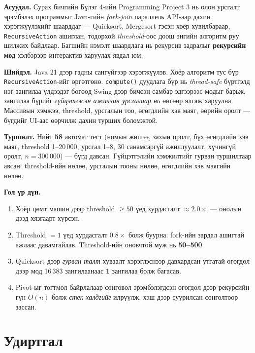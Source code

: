 \documentclass[11pt,a4paper]{article}
\begin{document}
\textbf{Асуудал.} Сурах бичгийн Бүлэг 4-ийн Programming Project 3 нь олон
урсгалт эрэмбэлэх программыг Java-гийн \emph{fork-join} параллель API-аар
дахин хэрэгжүүлэхийг шаарддаг --- Quicksort, Mergesort гэсэн хоёр хувилбараар,
\texttt{RecursiveAction} ашиглан, тодорхой \emph{threshold}-оос доош энгийн
алгоритм руу шилжих байдлаар. Багшийн нэмэлт шаардлага нь рекурсив задралыг
\textbf{рекурсийн мод} хэлбэрээр интерактив харуулах явдал юм.

\textbf{Шийдэл.} Java 21 дээр гадны сангүйгээр хэрэгжүүлэв. Хоёр алгоритм
тус бүр \texttt{RecursiveAction}-ийг өргөтгөнө. \texttt{compute()} дуудлага бүр
нь \emph{thread-safe} бүртгэлд нэг зангилаа үлдээдэг бөгөөд Swing дээр бичсэн
самбар эдгээрээс модыг барьж, зангилаа бүрийг \emph{гүйцэтгэсэн ажилчин
урсгалаар нь} өнгөөр ялгаж харуулна. Массивын хэмжээ, threshold, урсгалын тоо,
өгөгдлийн хэв маяг, өөрийн оролт --- бүгдийг UI-аас өөрчилж дахин турших
боломжтой.

\textbf{Туршилт.} Нийт \textbf{58} автомат тест (номын жишээ, захын оролт,
бүх өгөгдлийн хэв маяг, threshold 1--20\,000, урсгал 1--8, 30 санамсаргүй
ажиллуулалт, хүчингүй оролт, $n = 300\,000$) --- бүгд давсан. Гүйцэтгэлийн
хэмжилтийг гурван туршилтаар авсан: threshold-ийн нөлөө, урсгалын тооны нөлөө,
өгөгдлийн хэв маягийн нөлөө.

\textbf{Гол үр дүн.}
\begin{enumerate}[nosep,leftmargin=*]
  \item Хоёр цөмт машин дээр threshold $\ge 50$ үед хурдасгалт $\approx
        \mathbf{2.0\times}$ --- онолын дээд хязгаарт хүрсэн.
  \item Threshold $= 1$ үед хурдасгалт $\mathbf{0.8\times}$ болж буурна:
        fork-ийн зардал ашигтай ажлаас давамгайлав. Threshold-ийн оновчтой
        муж нь \textbf{50--500}.
  \item Quicksort дээр \emph{гурван талт} хуваалт хэрэглэснээр давхардсан
        утгатай өгөгдөл дээр мод 16\,383 зангилаанаас \textbf{1} зангилаа болж
        багасав.
  \item Pivot-ыг тогтмол байрлалаар сонговол эрэмбэлэгдсэн өгөгдөл дээр
        рекурсийн гүн $O(n)$ болж \emph{стек халдгийг} илрүүлж, хэш дээр
        суурилсан сонголтоор зассан.
\end{enumerate}

\newpage
\section{Удиртгал}
\end{document}
